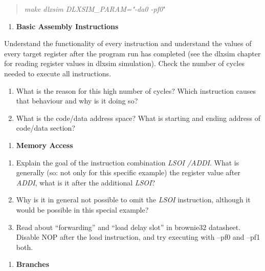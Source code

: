 \documentclass[
]{article}
\begin{document}
\begin{quote}
\emph{make dlxsim DLXSIM\_PARAM="-da0 -pf0}"
\end{quote}

\begin{enumerate}
\def\labelenumi{\arabic{enumi}.}
\setcounter{enumi}{1}
\item
  \textbf{Basic Assembly Instructions}
\end{enumerate}

Understand the functionality of every instruction and understand the
values of every target register after the program run has completed (see
the dlxsim chapter for reading register values in dlxsim simulation).
Check the number of cycles needed to execute all instructions.

\begin{enumerate}
\def\labelenumi{\alph{enumi})}
\item
  What is the reason for this high number of cycles? Which instruction
  causes that behaviour and why is it doing so?
\item
  What is the code/data address space? What is starting and ending
  address of code/data section?
\end{enumerate}

\begin{enumerate}
\def\labelenumi{\arabic{enumi}.}
\setcounter{enumi}{2}
\item
  \textbf{Memory Access}
\end{enumerate}

\begin{enumerate}
\def\labelenumi{\alph{enumi})}
\item
  Explain the goal of the instruction combination \emph{LSOI /ADDI}.
  What is generally (so: not only for this specific example) the
  register value after \emph{ADDI}, what is it after the additional
  \emph{LSOI}?
\item
  Why is it in general not possible to omit the \emph{LSOI} instruction,
  although it would be possible in this special example?
\item
  Read about ``forwarding'' and ``load delay slot'' in brownie32
  datasheet. Disable NOP after the load instruction, and try executing
  with --pf0 and --pf1 both.
\end{enumerate}

\begin{enumerate}
\def\labelenumi{\arabic{enumi}.}
\setcounter{enumi}{3}
\item
  \textbf{Branches}
\end{enumerate}
\end{document}
